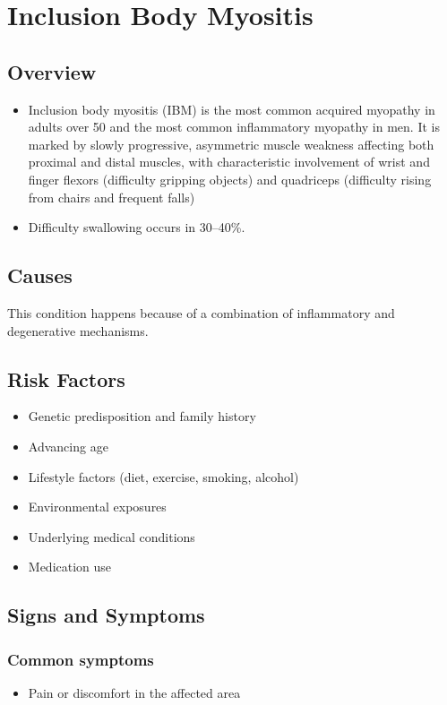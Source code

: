 \chapter{Inclusion Body Myositis}
\label{sec:Inclusion Body Myositis}

\section{Overview}


\begin{itemize}[noitemsep]
  \item Inclusion body myositis (IBM) is the most common acquired myopathy in adults over 50 and the most common inflammatory myopathy in men. It is marked by slowly progressive, asymmetric muscle weakness affecting both proximal and distal muscles, with characteristic involvement of wrist and finger flexors (difficulty gripping objects) and quadriceps (difficulty rising from chairs and frequent falls)
  \item Difficulty swallowing occurs in 30--40\%.
\end{itemize}
\section{Causes}
This condition happens because of a combination of inflammatory and degenerative mechanisms.     
\section{Risk Factors}

\begin{itemize}[noitemsep]
  \item Genetic predisposition and family history
  \item Advancing age
  \item Lifestyle factors (diet, exercise, smoking, alcohol)
  \item Environmental exposures
  \item Underlying medical conditions
  \item Medication use
\end{itemize}
\section{Signs and Symptoms}

\subsection{Common symptoms}
\begin{itemize}[noitemsep]
  \item Pain or discomfort in the affected area
  \end{itemize}

